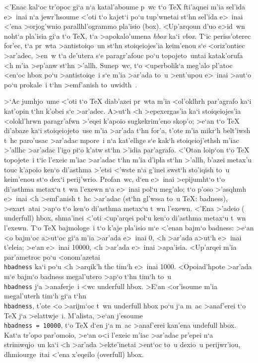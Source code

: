 <'Enac kal`oc tr'opoc gi`a n`a katal'aboume p~wc t`o {\rm \TeX}
fti'aqnei m'ia sel'ida e>~inai n`a jewr'hsoume <'oti t`o kajet`i po`u
tup'wnetai st`hn sel'ida e>~inai <'ena >orjog'wnio parallhl'ogrammo
pla'isio ({\rm box}).  <Up'arqoun d'uo e>id~wn noht`a pla'isia gi`a t`o
{\rm \TeX}, t`a >apokalo'umena {\sl hbox\/} ka`i {\sl vbox}.  T`ic
periss'oterec for'ec, t`a pr~wta >antistoiqo~un st`hn stoiqeiojes'ia
keim'enou s`e <oriz'ontiec >ar'adec, >en~w t`a de'utera s`e paragr'afouc
po`u topojeto~untai katak'orufa <h m'ia >ep'anw st`hn >'allh.  Sunep~wc,
t`o <uperbolik`a meg'alo pl'atoc <en`oc {\rm hbox} po`u >antistoiqe~i
s`e m'ia >ar'ada to~u >ent'upou e>~inai >aut`o po`u prokale~i t`hn
>emf'anish to~u\NB{}\vrule width \overfullrule$\,$.

>`Ac jumhjo~ume <'oti t`o {\rm \TeX} diab'azei pr~wta m'ia <ol'oklhrh
par'agrafo ka`i kat'opin t`hn k'obei s`e >ar'adec.  A>ut`h <h
>epexergas'ia ka`i stoiqeiojes'ia <olokl'hrwn paragr'afwn >'eqei k'apoio
sugkekrim'eno skop'o; >e`an t`o {\rm \TeX} di'abaze ka`i
stoiqeiojeto~use m'ia >ar'ada t`hn for'a, t'ote m'ia mikr`h belt'iwsh
t~hc paro'usac >ar'adac mpore~i n`a kat'elhge s`e kak`h stoiqeioj'ethsh
m'iac >'allhc >ar'adac l'igo pi`o k'atw st`hn >'idia par'agrafo. <'Otan
loip`on t`o {\rm \TeX} topojete~i t`ic l'exeic m'iac >ar'adac t`hn m'ia
d'ipla st`hn >'allh, b'azei metax'u touc k'apoio ken`o di'asthma >'etsi
<'wste n`a g'inei swst`h sto'iqish to~u keim'enou st`o dex`i perij'wrio.
Profan~wc, d`en e>~inai >epijumht`o t`o di'asthma metax`u t~wn l'exewn  
n`a e>~inai pol`u meg'alo; t`o p'oso >'asqhmh e>~inai <h >emf'anish t~hc   
>ar'adac (st`hn gl'wssa to~u {\rm \TeX}: {\rm badness}), >exart~atai
>ap`o t`o ken`o di'asthma metax`u t~wn l'exewn.  <'Ena >'adeio ({\rm
underfull}) {\rm hbox}, shma'inei <'oti <up'arqei pol`u ken`o di'asthma
metax`u t~wn l'exewn.  T`o {\rm \TeX} baj\-mo\-lo\-ge~i t`o k'aje
pla'isio m`e <'enan bajm`o {\rm badness}: >e`an <o bajm`oc a>ut`oc gi`a
m'ia >ar'ada e>~inai 0, <h >ar'ada a>ut`h e>~inai t'eleia; >e`an e>~inai
10000, <h >ar'ada e>~inai >apa'isia.  <Up'arqei m'ia par'ametroc po`u
<onom'azetai {\tt \\hbadness} ka`i po`u <h >arqik'h thc tim`h e>~inai
1000\null. <Opoiad'hpote >ar'ada m`e bajm`o {\rm badness} megal'utero
>ap`o t`hn tim`h to~u {\tt \\hbadness} j`a >anaferje~i <wc {\rm
underfull hbox}. >E`an <or'isoume m'ia megal'uterh tim`h gi`a t`hn {\tt
\\hbadness}, t'ote <o >arijm`oc t~wn {\rm underfull hbox} po`u j`a m~ac
>anaf'erei t`o {\rm \TeX} j`a >elattwje~i.  M'alista, >e`an j'esoume {\tt
\\hbadness = 10000}, t`o {\rm \TeX} d`en j`a m~ac >anaf'erei kan'ena
{\rm undefull hbox}.  Kat`a tr'opo par'omoio, >e`an o<i l'exeic m'iac
>ar'adac pr'epei n`a strimwqjo~un ka`i <h >ar'ada >ekte'inetai >ent`oc
to~u dexio~u perijwr'iou, dhmiourge~itai <'ena x'eqeilo ({\rm overfull})
{\rm hbox}.

